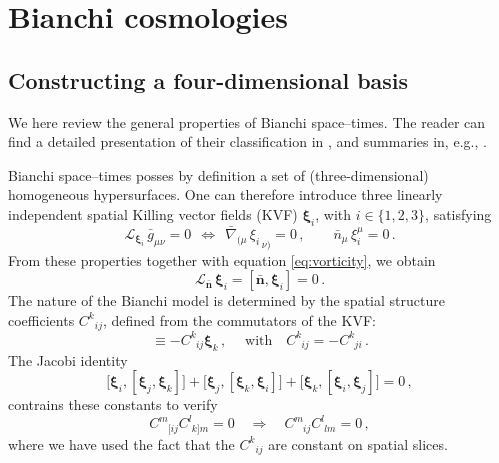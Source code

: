 \documentclass[notitlepage,onecolumn,floatfix,preprintnumbers,aps,prd,showpacs,nofootinbib,amsmath,amssymb,amsfonts]{revtex4-1}
\newcommand{\Lie}{\mathcal{L}}
\newcommand{\be}{\begin{equation}}
\newcommand{\ee}{\end{equation}}
\newcommand{\gr}[1]{{\bm #1}}
\newcommand{\<}{\langle}
\renewcommand{\>}{\rangle}
\begin{document}
\section{Bianchi cosmologies} \label{sec:bianchi_cosmo}

\subsection{Constructing a four-dimensional basis}

We here review the general properties of Bianchi space--times. The reader can find a detailed 
presentation of their classification in \cite{1969CMaPh..12..108E}, and summaries in, e.g., 
\cite{Ellis:1998ct,Pontzen:2007ii}. 

Bianchi space--times posses by definition a set of (three-dimensional) homogeneous hypersurfaces. 
One can therefore introduce three linearly independent spatial Killing vector fields (KVF) $\bm \xi_i$, 
with $i \in \{ 1, 2, 3 \}$, satisfying 
\be \label{eq:KVF}
	\Lie_{\bm \xi_i} \, \bar g_{\mu \nu} = 0 
		\;\, \Leftrightarrow \;\, 
			\bar \nabla_{(\mu} \, {\xi_i}_{\, \nu )} = 0 \, , 
		\qquad 
	\bar n_\mu \, \xi_i^\mu = 0 \, . 
\ee
From these properties together with equation \eqref{eq:vorticity}, we obtain 
\be \label{eq:KVF_prop}
	\Lie_{\bm{\bar n}}\, \bm \xi_i 
		= \left[ \bar{\gr{n}}, \bm \xi_i \right] 
		= 0 \, .  
\ee
The nature of the Bianchi model is determined by the spatial structure coefficients $C^k{}_{i j}$, 
defined from the commutators of the KVF: 
\be
	[\bm \xi_i, \bm \xi_j ] 
		\equiv - C^k_{\phantom{k} i j} \bm \xi_k \, , 
		\quad\; \mathrm{with} \quad 
	C^k_{\phantom{k} i j} = - C^k_{\phantom{k} j i} \, . 
	\label{eq:coeff_struct_xi}
\ee
The Jacobi identity 
\be
	\big[ \bm \xi_i, [ \bm \xi_j, \bm \xi_k ] \big] 
	+ \big[ \bm \xi_j, [ \bm \xi_k, \bm \xi_i ] \big] 
	+ \big[ \bm \xi_k, [ \bm \xi_i, \bm \xi_j ] \big] 
	= 0 \, , 
\ee
contrains these constants to verify
\be \label{eq:jacobi}
	C^m_{\phantom{m} [ i j} C^l_{\phantom{l} k ] m} = 0 
		\quad \Rightarrow \quad 
	C^m_{\phantom{m} i j} C^l_{\phantom{l} l m} = 0 \, , 
\ee
where we have used the fact that the $C^k{}_{i j}$ are constant on spatial slices. 
\end{document}
